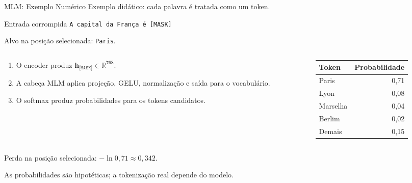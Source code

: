 \documentclass[aspectratio=169, xcolor=dvipsnames]{beamer}
\begin{document}
  \begin{frame}{MLM: Exemplo Numérico}
    Exemplo didático: cada palavra é tratada como um token.
    \begin{block}{Entrada corrompida}
      \texttt{A capital da França é [MASK]}\par
      Alvo na posição selecionada: \texttt{Paris}.
    \end{block}
    \begin{columns}[T]
      \begin{column}{0.54\textwidth}
        \begin{enumerate}
          \item O encoder produz $\mathbf h_{\texttt{[MASK]}}\in\mathbb R^{768}$.
          \item A cabeça MLM aplica projeção, GELU, normalização e saída para o vocabulário.
          \item O softmax produz probabilidades para os tokens candidatos.
        \end{enumerate}
      \end{column}
      \begin{column}{0.40\textwidth}
        \centering
        \begin{tabular}{lr}
          \toprule
          Token & Probabilidade\\
          \midrule
          Paris & 0,71\\
          Lyon & 0,08\\
          Marselha & 0,04\\
          Berlim & 0,02\\
          Demais & 0,15\\
          \bottomrule
        \end{tabular}
      \end{column}
    \end{columns}
    \medskip
    Perda na posição selecionada: $-\ln 0{,}71\approx0{,}342$.
    \par\small As probabilidades são hipotéticas; a tokenização real depende do modelo.
  \end{frame}
\end{document}

